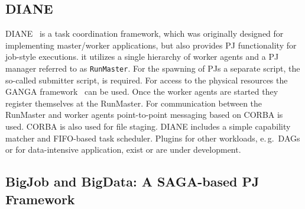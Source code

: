 \documentclass[conference]{IEEEtran}
\begin{document}


\subsection{DIANE}
DIANE~\cite{Moscicki:908910} is a task coordination framework, which
was originally designed for implementing master/worker applications,
but also provides PJ functionality for job-style executions. it
utilizes a single hierarchy of worker agents and a PJ manager referred
to as \texttt{RunMaster}.  For the spawning of PJs a separate script,
the so-called submitter script, is required. For access to the
physical resources the GANGA framework~\cite{Moscicki20092303} can be
used.  Once the worker agents are started they register themselves at
the RunMaster.  For communication between the RunMaster and worker
agents point-to-point messaging based on
CORBA is used. CORBA is also used for file
staging.  DIANE includes a simple capability matcher and FIFO-based
task scheduler.  Plugins for other workloads, e.\,g.\ DAGs or for
data-intensive application, exist or are under development. 


\subsection{BigJob and BigData: A SAGA-based PJ Framework}
\label{sec:bigjob_description}






\end{document}
